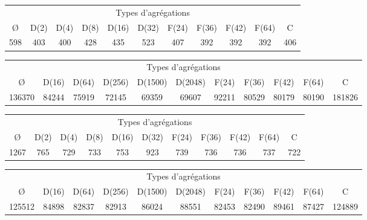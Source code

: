 \begin{center}
  \begin{tabular}{|c|c|c|c|c|c|c|c|c|c|c|}
    \hline
    \multicolumn{11}{|c|}{Types d'agrégations}\\
    \O & D(2) & D(4) & D(8) & D(16) & D(32) & F(24) & F(36) & F(42) & F(64) & C \\
    \hline
    598 & 403 & 400 & 428 & 435 & 523 & 407 & 392 & 392 & 392 & 406 \\
    \hline
  \end{tabular}
  \label{tab:epa}
\end{center}


\begin{center}
  \begin{tabular}{|c|c|c|c|c|c|c|c|c|c|c|}
    \hline
    \multicolumn{11}{|c|}{Types d'agrégations}\\
    \O & D(16) & D(64) & D(256) & D(1500) & D(2048) & F(24) & F(36) & F(42) & F(64) & C \\
    \hline
    136370 & 84244 & 75919 & 72145 & 69359 & 69607 & 92211 & 80529 & 80179 & 80190 & 181826 \\
    \hline
  \end{tabular}
  \label{tab:roadnet}
\end{center}



\begin{center}
  \begin{tabular}{|c|c|c|c|c|c|c|c|c|c|c|}
    \hline
    \multicolumn{11}{|c|}{Types d'agrégations}\\
    \O & D(2) & D(4) & D(8) & D(16) & D(32) & F(24) & F(36) & F(42) & F(64) & C \\
    \hline
    1267 & 765 & 729 & 733 & 753 & 923 & 739 & 736 & 736 & 737 & 722 \\
    \hline
  \end{tabular}
  \label{tab:stanford}
\end{center}


\begin{center}
  \begin{tabular}{|c|c|c|c|c|c|c|c|c|c|c|}
    \hline
    \multicolumn{11}{|c|}{Types d'agrégations}\\
    \O & D(16) & D(64) & D(256) & D(1500) & D(2048) & F(24) & F(36) & F(42) & F(64) & C \\
    \hline
    125512 & 84898 & 82837 & 82913 & 86024 & 88551 & 82453 & 82490 & 89461 & 87427 & 124889 \\
    \hline
  \end{tabular}
  \label{tab:webbase}
\end{center}
